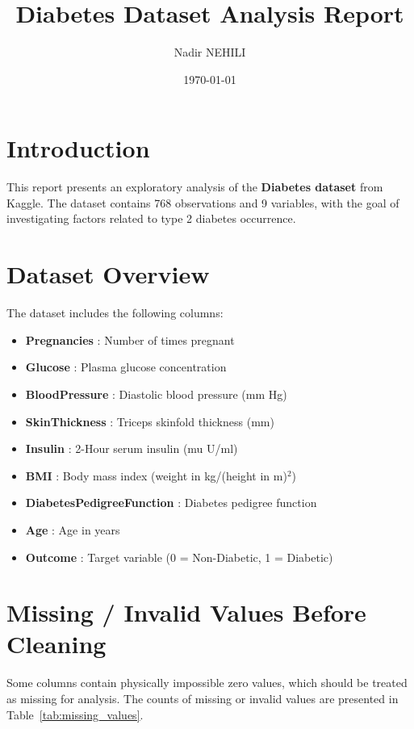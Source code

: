 \documentclass[12pt,a4paper]{article}
\title{Diabetes Dataset Analysis Report}
\author{Nadir NEHILI}
\date{\today}
\begin{document}
\maketitle

\section{Introduction}
This report presents an exploratory analysis of the \textbf{Diabetes dataset} from Kaggle. The dataset contains 768 observations and 9 variables, with the goal of investigating factors related to type 2 diabetes occurrence.

\section{Dataset Overview}
The dataset includes the following columns:

\begin{itemize}
    \item \textbf{Pregnancies} : Number of times pregnant
    \item \textbf{Glucose} : Plasma glucose concentration
    \item \textbf{BloodPressure} : Diastolic blood pressure (mm Hg)
    \item \textbf{SkinThickness} : Triceps skinfold thickness (mm)
    \item \textbf{Insulin} : 2-Hour serum insulin (mu U/ml)
    \item \textbf{BMI} : Body mass index (weight in kg/(height in m)$^2$)
    \item \textbf{DiabetesPedigreeFunction} : Diabetes pedigree function
    \item \textbf{Age} : Age in years
    \item \textbf{Outcome} : Target variable (0 = Non-Diabetic, 1 = Diabetic)
\end{itemize}

\section{Missing / Invalid Values Before Cleaning}
Some columns contain physically impossible zero values, which should be treated as missing for analysis. The counts of missing or invalid values are presented in Table~\ref{tab:missing_values}.
\end{document}
